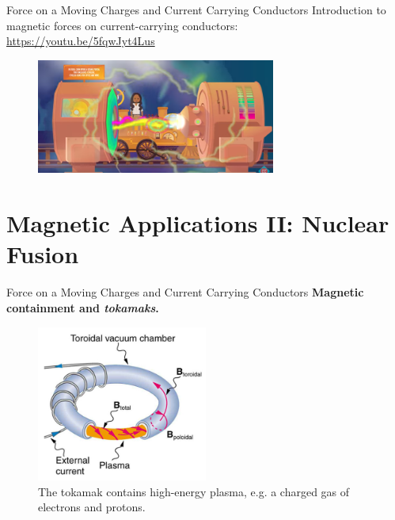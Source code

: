 \documentclass{beamer}
\begin{document}
\begin{frame}{Force on a Moving Charges and Current Carrying Conductors}
Introduction to magnetic forces on current-carrying conductors: \\ \vspace{0.5cm}
\url{https://youtu.be/5fqwJyt4Lus} \\
\begin{figure}
\centering
\includegraphics[width=0.7\textwidth]{figures/pbs.png}
\end{figure}
\end{frame}

\section{Magnetic Applications II: Nuclear Fusion}

\begin{frame}{Force on a Moving Charges and Current Carrying Conductors}
\textbf{Magnetic containment and \textit{tokamaks}.}
\begin{figure}
\centering
\includegraphics[width=0.5\textwidth]{figures/tokamak.png}
\caption{\label{fig:tokamak} The tokamak contains high-energy plasma, e.g. a charged gas of electrons and protons.}
\end{figure}
\end{frame}
\end{document}
